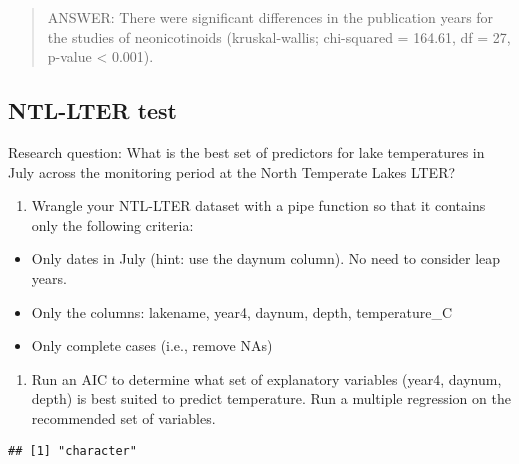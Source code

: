 \documentclass[]{article}
\newenvironment{Shaded}{\begin{snugshade}}{\end{snugshade}}
\newcommand{\KeywordTok}[1]{\textcolor[rgb]{0.13,0.29,0.53}{\textbf{#1}}}
\newcommand{\CommentTok}[1]{\textcolor[rgb]{0.56,0.35,0.01}{\textit{#1}}}
\newcommand{\OperatorTok}[1]{\textcolor[rgb]{0.81,0.36,0.00}{\textbf{#1}}}
\newcommand{\NormalTok}[1]{#1}
\providecommand{\tightlist}{%
  \setlength{\itemsep}{0pt}\setlength{\parskip}{0pt}}
\begin{document}
\begin{quote}
ANSWER: There were significant differences in the publication years for
the studies of neonicotinoids (kruskal-wallis; chi-squared = 164.61, df
= 27, p-value \textless{} 0.001).
\end{quote}

\subsection{NTL-LTER test}\label{ntl-lter-test}

Research question: What is the best set of predictors for lake
temperatures in July across the monitoring period at the North Temperate
Lakes LTER?

\begin{enumerate}
\def\labelenumi{\arabic{enumi}.}
\setcounter{enumi}{10}
\tightlist
\item
  Wrangle your NTL-LTER dataset with a pipe function so that it contains
  only the following criteria:
\end{enumerate}

\begin{itemize}
\tightlist
\item
  Only dates in July (hint: use the daynum column). No need to consider
  leap years.
\item
  Only the columns: lakename, year4, daynum, depth, temperature\_C
\item
  Only complete cases (i.e., remove NAs)
\end{itemize}

\begin{enumerate}
\def\labelenumi{\arabic{enumi}.}
\setcounter{enumi}{11}
\tightlist
\item
  Run an AIC to determine what set of explanatory variables (year4,
  daynum, depth) is best suited to predict temperature. Run a multiple
  regression on the recommended set of variables.
\end{enumerate}

\begin{Shaded}
\end{Shaded}

\begin{verbatim}
## [1] "character"
\end{verbatim}
\end{document}

